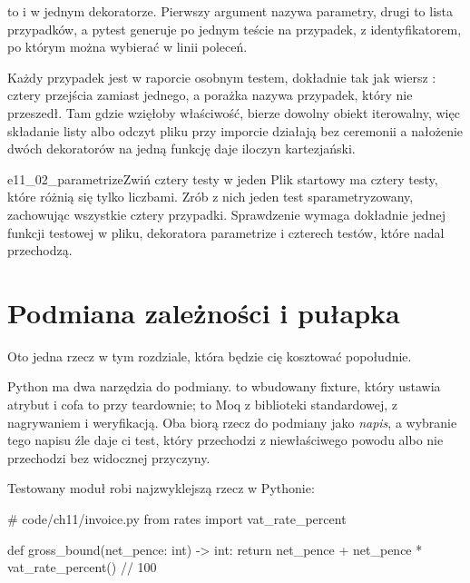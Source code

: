  to \code{[Theory]} i \code{[InlineData]} w jednym
dekoratorze. Pierwszy argument nazywa parametry, drugi to lista przypadków,
a pytest generuje po jednym teście na przypadek, z identyfikatorem, po
którym można wybierać w linii poleceń.


\begin{csbox}
Każdy przypadek jest w raporcie osobnym testem, dokładnie tak jak wiersz
\code{[InlineData]}: cztery przejścia zamiast jednego, a porażka nazywa
przypadek, który nie przeszedł. Tam gdzie \code{[MemberData]} wzięłoby
właściwość,  bierze dowolny obiekt iterowalny, więc
składanie listy albo odczyt pliku przy imporcie działają bez ceremonii
\dash{} a nałożenie dwóch dekoratorów  na jedną funkcję
daje iloczyn kartezjański.
\end{csbox}

\begin{exercise}{e11_02_parametrize}{Zwiń cztery testy w jeden}
Plik startowy ma cztery testy, które różnią się tylko liczbami. Zrób z nich
jeden test sparametryzowany, zachowując wszystkie cztery przypadki.
Sprawdzenie wymaga dokładnie jednej funkcji testowej w pliku, dekoratora
parametrize i czterech testów, które nadal przechodzą.
\end{exercise}

\section{Podmiana zależności i pułapka}
\label{sec:testing-patching}

Oto jedna rzecz w tym rozdziale, która będzie cię kosztować popołudnie.

Python ma dwa narzędzia do podmiany.  to wbudowany fixture,
który ustawia atrybut i cofa to przy teardownie;  to Moq
z biblioteki standardowej, z nagrywaniem i weryfikacją. Oba biorą rzecz do
podmiany jako \emph{napis}, a wybranie tego napisu źle daje ci test, który
przechodzi z niewłaściwego powodu albo nie przechodzi bez widocznej
przyczyny.

Testowany moduł robi najzwyklejszą rzecz w Pythonie:

\begin{python}
# code/ch11/invoice.py
from rates import vat_rate_percent

def gross_bound(net_pence: int) -> int:
    return net_pence + net_pence * vat_rate_percent() // 100
\end{python}

